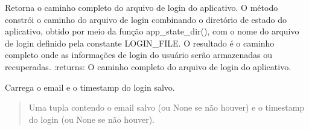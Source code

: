 \documentclass[letterpaper,10pt,english]{sphinxmanual}
\begin{document}

\begin{fulllineitems}
\label{\detokenize{api/user_login:user_login.login_path}}
\pysigstartsignatures
\pysiglinewithargsret
{}
{}
{}
\pysigstopsignatures
\sphinxAtStartPar
Retorna o caminho completo do arquivo de login do aplicativo. O método constrói o caminho do arquivo de login combinando o diretório de estado do aplicativo, obtido por meio da função app\_state\_dir(), com o nome do arquivo de login definido pela constante LOGIN\_FILE. O resultado é o caminho completo onde as informações de login do usuário serão armazenadas ou recuperadas.
:returns: O caminho completo do arquivo de login do aplicativo.
\begin{quote}\begin{description}
\sphinxAtStartPar
{}

\end{description}\end{quote}

\end{fulllineitems}


\begin{fulllineitems}
\label{\detokenize{api/user_login:user_login.load_login}}
\pysigstartsignatures
\pysiglinewithargsret
{}
{}
{}
\pysigstopsignatures
\sphinxAtStartPar
Carrega o e\sphinxhyphen{}mail e o timestamp do login salvo.
\begin{quote}\begin{description}
\sphinxAtStartPar
Uma tupla contendo o e\sphinxhyphen{}mail salvo (ou None se não houver) e o timestamp do login (ou None se não houver).

\sphinxAtStartPar
{}

\end{description}\end{quote}

\end{fulllineitems}
\end{document}
